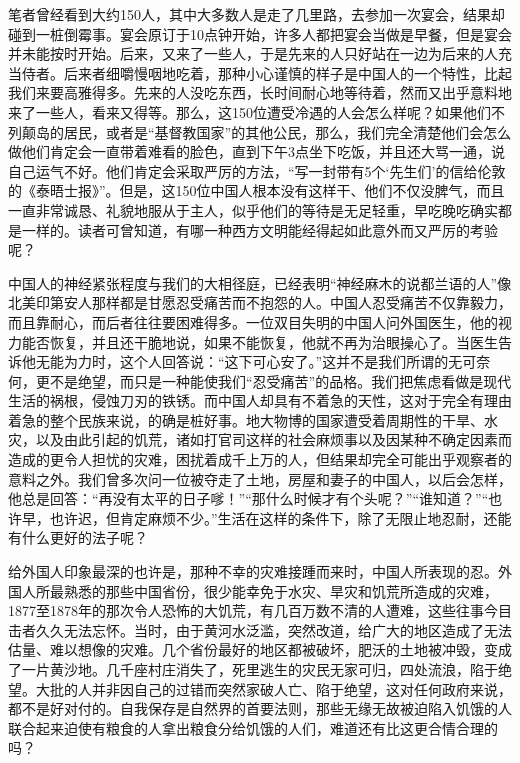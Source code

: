 \documentclass[12pt,oneside]{book}
\begin{document}
\begin{common-format}
笔者曾经看到大约150人，其中大多数人是走了几里路，去参加一次宴会，结果却碰到一桩倒霉事。宴会原订于10点钟开始，许多人都把宴会当做是早餐，但是宴会并未能按时开始。后来，又来了一些人，于是先来的人只好站在一边为后来的人充当侍者。后来者细嚼慢咽地吃着，那种小心谨慎的样子是中国人的一个特性，比起我们来要高雅得多。先来的人没吃东西，长时间耐心地等待着，然而又出乎意料地来了一些人，看来又得等。那么，这150位遭受冷遇的人会怎么样呢？如果他们不列颠岛的居民，或者是“基督教国家”的其他公民，那么，我们完全清楚他们会怎么做他们肯定会一直带着难看的脸色，直到下午3点坐下吃饭，并且还大骂一通，说自己运气不好。他们肯定会采取严厉的方法，“写一封带有5个‘先生们’的信给伦敦的《泰晤士报》”。但是，这150位中国人根本没有这样干、他们不仅没脾气，而且一直非常诚恳、礼貌地服从于主人，似乎他们的等待是无足轻重，早吃晚吃确实都是一样的。读者可曾知道，有哪一种西方文明能经得起如此意外而又严厉的考验呢？ 

中国人的神经紧张程度与我们的大相径庭，已经表明“神经麻木的说都兰语的人”像北美印第安人那样都是甘愿忍受痛苦而不抱怨的人。中国人忍受痛苦不仅靠毅力，而且靠耐心，而后者往往要困难得多。一位双目失明的中国人问外国医生，他的视力能否恢复，并且还干脆地说，如果不能恢复，他就不再为治眼操心了。当医生告诉他无能为力时，这个人回答说：“这下可心安了。”这并不是我们所谓的无可奈何，更不是绝望，而只是一种能使我们“忍受痛苦”的品格。我们把焦虑看做是现代生活的祸根，侵蚀刀刃的铁锈。而中国人却具有不着急的天性，这对于完全有理由着急的整个民族来说，的确是桩好事。地大物博的国家遭受着周期性的干旱、水灾，以及由此引起的饥荒，诸如打官司这样的社会麻烦事以及因某种不确定因素而造成的更令人担忧的灾难，困扰着成千上万的人，但结果却完全可能出乎观察者的意料之外。我们曾多次问一位被夺走了土地，房屋和妻子的中国人，以后会怎样，他总是回答：“再没有太平的日子嗲！”“那什么时候才有个头呢？”“谁知道？”“也许早，也许迟，但肯定麻烦不少。”生活在这样的条件下，除了无限止地忍耐，还能有什么更好的法子呢？ 

给外国人印象最深的也许是，那种不幸的灾难接踵而来时，中国人所表现的忍。外国人所最熟悉的那些中国省份，很少能幸免于水灾、旱灾和饥荒所造成的灾难，1877至1878年的那次令人恐怖的大饥荒，有几百万数不清的人遭难，这些往事今目击者久久无法忘怀。当时，由于黄河水泛滥，突然改道，给广大的地区造成了无法估量、难以想像的灾难。几个省份最好的地区都被破坏，肥沃的土地被冲毁，变成了一片黄沙地。几千座村庄消失了，死里逃生的灾民无家可归，四处流浪，陷于绝望。大批的人并非因自己的过错而突然家破人亡、陷于绝望，这对任何政府来说，都不是好对付的。自我保存是自然界的首要法则，那些无缘无故被迫陷入饥饿的人联合起来迫使有粮食的人拿出粮食分给饥饿的人们，难道还有比这更合情合理的吗？ 


\end{common-format}
\end{document}
